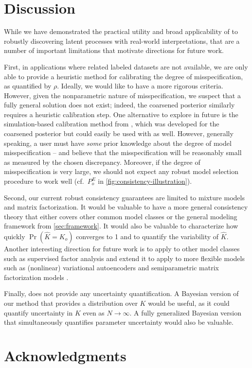 \section{Discussion} \label{sec:discussion}

While we have demonstrated the practical utility and broad applicability of \methodname to robustly discovering latent processes with real-world interpretations, that are a number of important limitations that motivate directions for future work.

First, in applications where related labeled datasets are not available, we are only able to provide a heuristic method for calibrating the degree of misspecification, as quantified by $\rho$.
Ideally, we would like to have a more rigorous criteria.
However, given the nonparametric nature of misspecification, we suspect that a fully general solution does not exist; indeed, the coarsened posterior similarly requires a heuristic calibration step.
One alternative to explore in future is the simulation-based calibration method from \citet{Xue:2024}, which was developed for the coarsened posterior but could easily be used with \methodname as well.
However, generally speaking, a user must have \emph{some} prior knowledge about the degree of model misspecification -- and believe that the misspecification will be reasonably small as measured by the chosen discrepancy.
Moreover, if the degree of misspecification is very large, we should not expect any robust model selection procedure to
work well (cf.\ $P_{o}^{E}$ in \cref{fig:consistency-illustration}).

Second, our current robust consistency guarantees are limited to mixture models and matrix factorization.
It would be valuable to have a more general consistency theory that either covers other common model classes
or the general modeling framework from \cref{sec:framework}.
It would also be valuable to characterize how quickly $\Pr(\widehat{K} = K_o)$ converges to 1 and to quantify the variability of $\widehat{K}$.
Another interesting direction for future work is to apply \methodname to other model classes such as supervised factor analysis and extend it to apply to more flexible models such as (nonlinear) variational autoencoders \citep{Kingma2014,Kingma2019VAEs} and semiparametric matrix factorization models \citep{Anandkumar2014uc,rohe2023vintage-7f4}.

Finally, \methodname does not provide any uncertainty quantification.
A Bayesian version of our method that provides a distribution over $K$ would be useful,
as it could quantify uncertainty in $K$ even as $N \to \infty$.
A fully generalized Bayesian version that simultaneously quantifies parameter uncertainty would also be valuable.
\section*{Acknowledgments}
